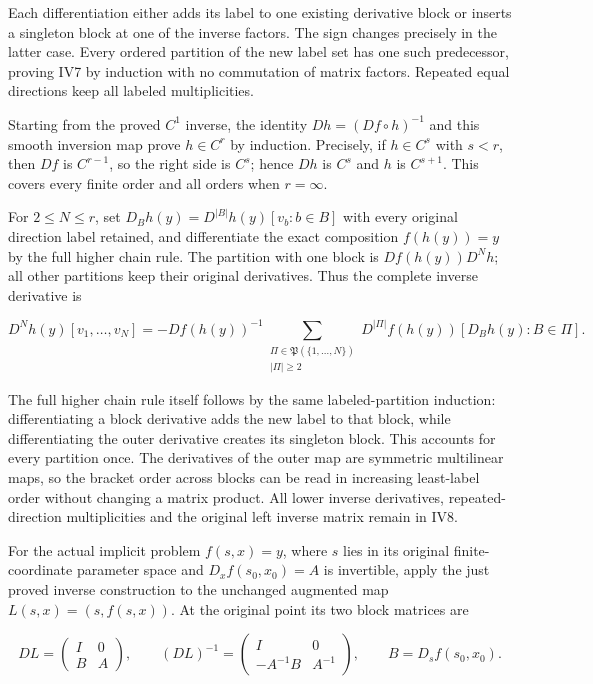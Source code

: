 \documentclass[
  11pt,
]{article}
\begin{document}
Each differentiation either adds its label to one existing derivative
block or inserts a singleton block at one of the inverse factors. The
sign changes precisely in the latter case. Every ordered partition of
the new label set has one such predecessor, proving IV7 by induction
with no commutation of matrix factors. Repeated equal directions keep
all labeled multiplicities.

Starting from the proved \(C^1\) inverse, the identity
\(Dh=(Df\circ h)^{-1}\) and this smooth inversion map prove \(h\in C^r\)
by induction. Precisely, if \(h\in C^s\) with \(s<r\), then \(Df\) is
\(C^{r-1}\), so the right side is \(C^s\); hence \(Dh\) is \(C^s\) and
\(h\) is \(C^{s+1}\). This covers every finite order and all orders when
\(r=\infty\).

For \(2\leq N\leq r\), set \(D_Bh(y)=D^{|B|}h(y)[v_b:b\in B]\) with
every original direction label retained, and differentiate the exact
composition \(f(h(y))=y\) by the full higher chain rule. The partition
with one block is \(Df(h(y))D^Nh\); all other partitions keep their
original derivatives. Thus the complete inverse derivative is

\[
 D^Nh(y)[v_1,\ldots,v_N]
 =-Df(h(y))^{-1}
   \sum_{\substack{\Pi\in\mathfrak P(\{1,\ldots,N\})\\|\Pi|\geq2}}
 D^{|\Pi|}f(h(y))
       [D_Bh(y):B\in\Pi].
 \tag{IV8}
\]

The full higher chain rule itself follows by the same labeled-partition
induction: differentiating a block derivative adds the new label to that
block, while differentiating the outer derivative creates its singleton
block. This accounts for every partition once. The derivatives of the
outer map are symmetric multilinear maps, so the bracket order across
blocks can be read in increasing least-label order without changing a
matrix product. All lower inverse derivatives, repeated-direction
multiplicities and the original left inverse matrix remain in IV8.

For the actual implicit problem \(f(s,x)=y\), where \(s\) lies in its
original finite-coordinate parameter space and \(D_xf(s_0,x_0)=A\) is
invertible, apply the just proved inverse construction to the unchanged
augmented map \(L(s,x)=(s,f(s,x))\). At the original point its two block
matrices are

\[
 DL=\begin{pmatrix}I&0\\ B&A\end{pmatrix},
 \qquad
 (DL)^{-1}=\begin{pmatrix}I&0\\-A^{-1}B&A^{-1}\end{pmatrix},
 \qquad B=D_sf(s_0,x_0).
 \tag{IV9}
\]
\end{document}
